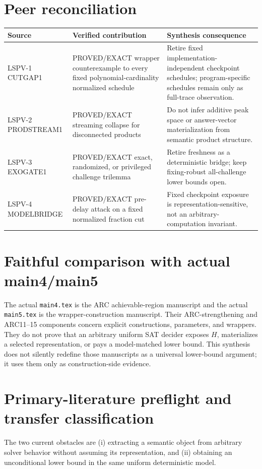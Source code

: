 \documentclass[11pt]{article}
\newcommand{\EXACT}{\textsf{PROVED/EXACT}}
\begin{document}
\section*{Peer reconciliation}
\begin{longtable}{>{\raggedright\arraybackslash}p{}
                  >{\raggedright\arraybackslash}p{}
                  >{\raggedright\arraybackslash}p{}}
\toprule
Source & Verified contribution & Synthesis consequence\\
\midrule
LSPV-1 CUTGAP1 & \EXACT{} wrapper counterexample to every fixed polynomial-cardinality normalized schedule & Retire fixed implementation-independent checkpoint schedules; program-specific schedules remain only as full-trace observation.\\
LSPV-2 PRODSTREAM1 & \EXACT{} streaming collapse for disconnected products & Do not infer additive peak space or answer-vector materialization from semantic product structure.\\
LSPV-3 EXOGATE1 & \EXACT{} exact, randomized, or privileged challenge trilemma & Retire freshness as a deterministic bridge; keep fixing-robust all-challenge lower bounds open.\\
LSPV-4 MODELBRIDGE & \EXACT{} pre-delay attack on a fixed normalized fraction cut & Fixed checkpoint exposure is representation-sensitive, not an arbitrary-computation invariant.\\
\bottomrule
\end{longtable}

\section*{Faithful comparison with actual main4/main5}
The actual \texttt{main4.tex} is the ARC achievable-region manuscript and the
actual \texttt{main5.tex} is the wrapper-construction manuscript.  Their
ARC-strengthening and ARC11--15 components concern explicit constructions,
parameters, and wrappers.  They do not prove that an arbitrary uniform SAT
decider exposes $H$, materializes a selected representation, or pays a
model-matched lower bound.  This synthesis does not silently redefine those
manuscripts as a universal lower-bound argument; it uses them only as
construction-side evidence.

\section*{Primary-literature preflight and transfer classification}
The two current obstacles are (i) extracting a semantic object from arbitrary
solver behavior without assuming its representation, and (ii) obtaining an
unconditional lower bound in the same uniform deterministic model.
\end{document}
